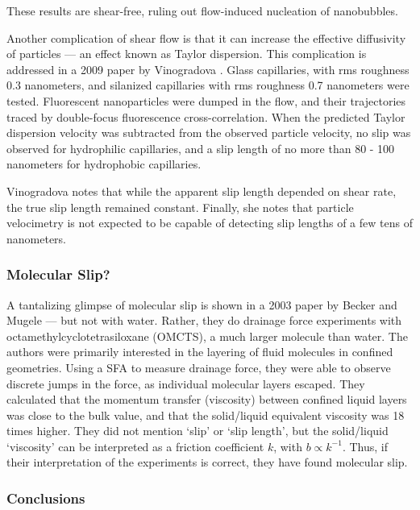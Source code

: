 \documentclass[12pt, a4paper, twoside, openright]{book}
\begin{document}
These results are shear-free, ruling out flow-induced nucleation of nanobubbles.

\vspace*{1em}
Another complication of shear flow is that it can increase the effective diffusivity of particles --- an effect known as Taylor dispersion. This complication is addressed in a 2009 paper by Vinogradova \cite{Vinogradova2009}. Glass capillaries, with rms roughness 0.3 nanometers, and silanized capillaries with rms roughness 0.7 nanometers were tested. Fluorescent nanoparticles were dumped in the flow, and their trajectories traced by double-focus fluorescence cross-correlation.  When the predicted Taylor dispersion velocity was subtracted from the observed particle velocity, no slip was observed for hydrophilic capillaries, and a slip length of no more than 80 - 100 nanometers for hydrophobic capillaries.

Vinogradova notes that while the apparent slip length depended on shear rate, the true slip length remained constant.  Finally, she notes that particle velocimetry is not expected to be capable of detecting slip lengths of a few tens of nanometers. 

\subsubsection*{Molecular Slip?}

A tantalizing glimpse of molecular slip is shown in a 2003 paper by Becker and Mugele \cite{BeckerMugele2003} --- but not with water.  Rather, they do drainage force experiments with octamethylcyclotetrasiloxane (OMCTS), a much larger molecule than water. The authors were primarily interested in the layering of fluid molecules in confined geometries.  Using a SFA to measure drainage force, they were able to observe discrete jumps in the force, as individual molecular layers escaped. They calculated that the momentum transfer (viscosity) between confined liquid layers was close to the bulk value, and that the solid/liquid equivalent viscosity was 18 times higher.  They did not mention `slip' or `slip length', but the solid/liquid `viscosity' can be interpreted as a friction coefficient $k$, with $b \propto k^{-1}$. Thus, if their interpretation of the experiments is correct, they have found molecular slip. 


\subsubsection*{Conclusions}
\end{document}
